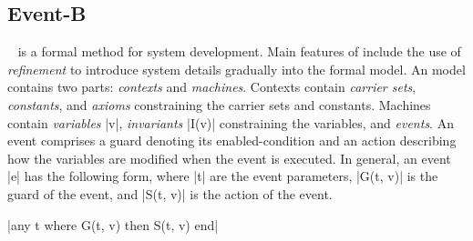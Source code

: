 
\subsection{Event-B}
\label{sec:eventb}

\EventB~\cite{abrial10:_model_event_b} is a formal method for system
development.  Main features of \EventB include the use of
\emph{refinement} to introduce system details gradually into the
formal model.  An \EventB model contains two parts: \emph{contexts} and \emph{machines}. Contexts contain \emph{carrier sets}, \emph{constants}, and \emph{axioms} constraining the carrier sets and constants.  Machines contain \emph{variables} |v|, \emph{invariants} |I(v)| constraining the variables, and \emph{events}. An event comprises a guard denoting its enabled-condition and an action describing how the variables are modified when the event is executed.  In general, an event |e| has the following form, where |t| are the event parameters, |G(t, v)| is the guard of the event, and |S(t, v)| is the action of the event.
\begin{center}
  |any t where G(t, v) then S(t, v) end|
\end{center}

